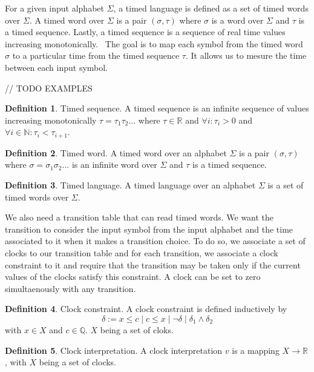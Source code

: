 \documentclass[12pt]{article}
\theoremstyle{definition}
\newtheorem{definition}{Definition}[section]
\theoremstyle{definition}
\theoremstyle{remark}
\newcommand{\R}{\mathbb{R}}
\newcommand{\Q}{\mathbb{Q}}
\begin{document}
For a given input alphabet $\Sigma$, a timed language is defined as a set of timed words over $\Sigma$. A timed word over $\Sigma$ is a pair $(\sigma, \tau)$ where $\sigma$ is a word over $\Sigma$ and $\tau$ is a timed sequence. Lastly, a timed sequence is a sequence of real time values increasing monotonically.~\cite{ALUR1994183} The goal is to map each symbol from the timed word $\sigma$ to a particular time from the timed sequence $\tau$. It allows us to mesure the time between each input symbol.

// TODO EXAMPLES

\theoremstyle{definition}
\begin{definition}{Timed sequence.}
A timed sequence is an infinite sequence of values increasing monotonically $\tau = \tau_1 \tau_2 ...$ where $\tau \in \R$ and $\forall i : \tau_i > 0$ and $\forall i \in \mathbb{N}: \tau_i < \tau_{i+1}$.
\end{definition}

\theoremstyle{definition}
\begin{definition}{Timed word.}
A timed word over an alphabet $\Sigma$ is a pair $(\sigma, \tau)$ where $\sigma = \sigma_1 \sigma_2 ...$ is an infinite word over $\Sigma$ and $\tau$ is a timed sequence.
\end{definition}

\theoremstyle{definition}
\begin{definition}{Timed language.}
A timed language over an alphabet $\Sigma$ is a set of timed words over $\Sigma$.
\end{definition}

We also need a transition table that can read timed words. We want the transition to consider the input symbol from the input alphabet and the time associated to it when it makes a transition choice. To do so, we associate a set of clocks to our transition table and for each transition, we associate a clock constraint to it and require that the transition may be taken only if the current values of the clocks satisfy this constraint. A clock can be set to zero simultaenously with any transition.

\theoremstyle{definition}
\begin{definition}{Clock constraint.} A clock constraint is defined inductively by
$$\delta := x \le c \mid c \le x \mid \neg \delta \mid \delta_1 \land \delta_2$$ with $x \in X$ and $c \in \Q$. $X$ being a set of cloks.
\end{definition}

\theoremstyle{definition}
\begin{definition}{Clock interpretation.} A clock interpretation $v$ is a mapping $X \to \R$, with $X$ being a set of clocks.
\end{definition}
\end{document}
